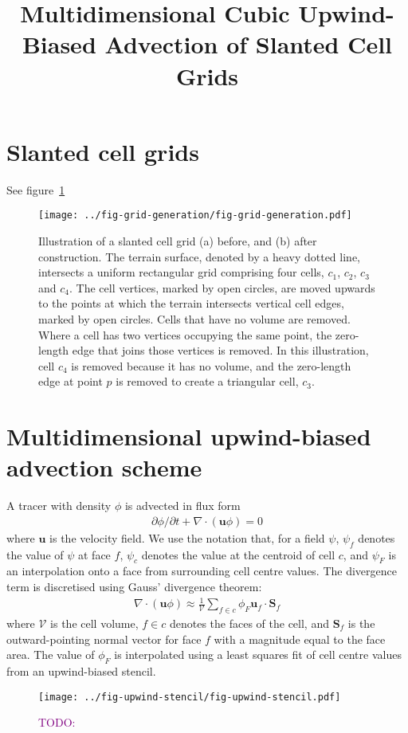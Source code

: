 \documentclass{article}
\title{Multidimensional Cubic Upwind-Biased Advection of Slanted Cell Grids}
\newcommand{\TODO}[1]{\textcolor{purple}{TODO: \emph{#1}}}
\begin{document}
\maketitle

\section{Slanted cell grids}
See figure~\ref{fig:grid-generation}
\begin{figure}
	\centering
	\texttt{[image: ../fig-grid-generation/fig-grid-generation.pdf]}
	\caption{Illustration of a slanted cell grid (a) before, and (b) after construction.
	The terrain surface, denoted by a heavy dotted line, intersects a uniform rectangular grid comprising four cells, $c_1$, $c_2$, $c_3$ and $c_4$.  The cell vertices, marked by open circles, are moved upwards to the points at which the terrain intersects vertical cell edges, marked by open circles.  Cells that have no volume are removed.  Where a cell has two vertices occupying the same point, the zero-length edge that joins those vertices is removed.  In this illustration, cell $c_4$ is removed because it has no volume, and the zero-length edge at point $p$ is removed to create a triangular cell, $c_3$.}
	\label{fig:grid-generation}
\end{figure}

\section{Multidimensional upwind-biased advection scheme}
A tracer with density $\phi$ is advected in flux form
\begin{align}
\partial \phi / \partial t + \nabla \cdot \left( \mathbf{u} \phi \right) = 0
\end{align}
where $\mathbf{u}$ is the velocity field.  We use the notation that, for a field $\psi$, $\psi_f$ denotes the value of $\psi$ at face $f$, $\psi_c$ denotes the value at the centroid of cell $c$, and $\psi_F$ is an interpolation onto a face from surrounding cell centre values.  The divergence term is discretised using Gauss' divergence theorem:
\begin{align}
	\nabla \cdot \left( \mathbf{u} \phi \right) \approx \frac{1}{\mathcal{V}} \sum_{f \in c} \phi_F \mathbf{u}_f \cdot \mathbf{S}_f
\end{align}
where $\mathcal{V}$ is the cell volume, $f \in c$ denotes the faces of the cell, and $\mathbf{S}_f$ is the outward-pointing normal vector for face $f$ with a magnitude equal to the face area.
The value of $\phi_F$ is interpolated using a least squares fit of cell centre values from an upwind-biased stencil.
\begin{figure}
	\centering
	\texttt{[image: ../fig-upwind-stencil/fig-upwind-stencil.pdf]}
	\caption{\TODO{}}
	\label{fig:upwind-stencil}
\end{figure}
\end{document}
